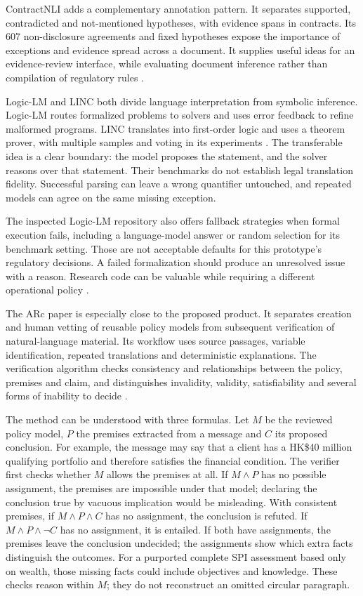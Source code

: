 \documentclass[12pt,a4paper,oneside,openany]{book}
\begin{document}
ContractNLI adds a complementary annotation pattern. It separates supported,
contradicted and not-mentioned hypotheses, with evidence spans in contracts.
Its 607 non-disclosure agreements and fixed hypotheses expose the importance of
exceptions and evidence spread across a document. It supplies useful ideas for
an evidence-review interface, while evaluating document inference rather than
compilation of regulatory rules \citep[secs.~2--5]{contractnli2021}.

Logic-LM and LINC both divide language interpretation from symbolic inference.
Logic-LM routes formalized problems to solvers and uses error feedback to refine
malformed programs. LINC translates into first-order logic and uses a theorem
prover, with multiple samples and voting in its experiments
\citep[sec.~3]{logiclm2023} \citep[secs.~2--5]{linc2023}. The transferable idea is a
clear boundary: the model proposes the statement, and the solver reasons over
that statement. Their benchmarks do not establish legal translation fidelity.
Successful parsing can leave a wrong quantifier untouched, and repeated models
can agree on the same missing exception.

The inspected Logic-LM repository also offers fallback strategies when formal
execution fails, including a language-model answer or random selection for its
benchmark setting. Those are not acceptable defaults for this prototype's
regulatory decisions. A failed formalization should produce an unresolved issue
with a reason. Research code can be valuable while requiring a different
operational policy \citep{libraryreview}.

The ARc paper is especially close to the proposed product. It separates creation
and human vetting of reusable policy models from subsequent verification of
natural-language material. Its workflow uses source passages, variable
identification, repeated translations and deterministic explanations. The
verification algorithm checks consistency and relationships between the policy,
premises and claim, and distinguishes invalidity, validity, satisfiability and
several forms of inability to decide
\citep[sec.~3 and Algorithm~1]{arc2025}.

The method can be understood with three formulas. Let $M$ be the reviewed policy
model, $P$ the premises extracted from a message and $C$ its proposed conclusion.
For example, the message may say that a client has a HK\$40 million qualifying
portfolio and therefore satisfies the financial condition. The verifier first
checks whether $M$ allows the premises at all. If $M\land P$ has no possible
assignment, the premises are impossible under that model; declaring the
conclusion true by vacuous implication would be misleading. With consistent
premises, if $M\land P\land C$ has no assignment, the conclusion is refuted.
If $M\land P\land\neg C$ has no assignment, it is entailed. If both have
assignments, the premises leave the conclusion undecided; the assignments show
which extra facts distinguish the outcomes. For a purported complete SPI
assessment based only on wealth, those missing facts could include objectives
and knowledge. These checks reason within $M$; they do not reconstruct an
omitted circular paragraph.
\end{document}
